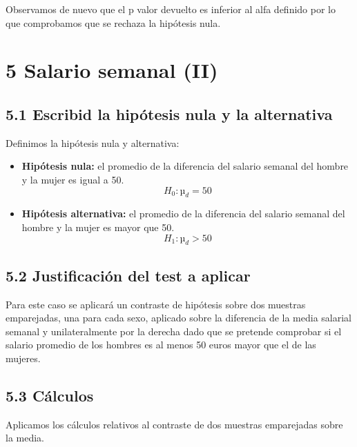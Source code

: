 \documentclass[
  a4paper]{article}
\providecommand{\tightlist}{%
  \setlength{\itemsep}{0pt}\setlength{\parskip}{0pt}}
\begin{document}
Observamos de nuevo que el p valor devuelto es inferior al alfa definido
por lo que comprobamos que se rechaza la hipótesis nula.

\hypertarget{salario-semanal-ii}{%
\section{5 Salario semanal (II)}\label{salario-semanal-ii}}

\hypertarget{escribid-la-hipuxf3tesis-nula-y-la-alternativa-2}{%
\subsection{5.1 Escribid la hipótesis nula y la
alternativa}\label{escribid-la-hipuxf3tesis-nula-y-la-alternativa-2}}

Definimos la hipótesis nula y alternativa:

\begin{itemize}
\tightlist
\item
  \textbf{Hipótesis nula:} el promedio de la diferencia del salario
  semanal del hombre y la mujer es igual a 50. \[H_0: µ_d = 50\]
\item
  \textbf{Hipótesis alternativa:} el promedio de la diferencia del
  salario semanal del hombre y la mujer es mayor que 50.
  \[H_1: µ_d > 50\]
\end{itemize}

\hypertarget{justificaciuxf3n-del-test-a-aplicar-2}{%
\subsection{5.2 Justificación del test a
aplicar}\label{justificaciuxf3n-del-test-a-aplicar-2}}

Para este caso se aplicará un contraste de hipótesis sobre dos muestras
emparejadas, una para cada sexo, aplicado sobre la diferencia de la
media salarial semanal y unilateralmente por la derecha dado que se
pretende comprobar si el salario promedio de los hombres es al menos 50
euros mayor que el de las mujeres.

\hypertarget{cuxe1lculos-2}{%
\subsection{5.3 Cálculos}\label{cuxe1lculos-2}}

Aplicamos los cálculos relativos al contraste de dos muestras
emparejadas sobre la media.
\end{document}
